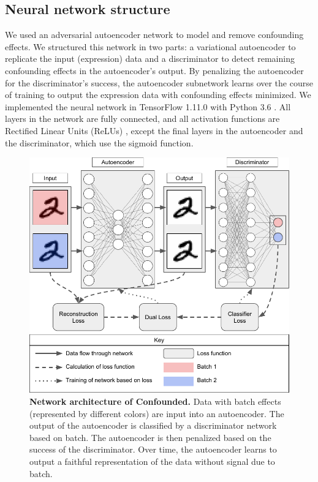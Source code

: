 \documentclass[11pt]{article}
\begin{document}
\subsection{Neural network structure}

We used an adversarial autoencoder network to model and remove confounding effects.
We structured this network in two parts: a variational autoencoder \cite{louizos_variational_2015} to replicate the input (expression) data and a discriminator to detect remaining confounding effects in the autoencoder's output.
By penalizing the autoencoder for the discriminator's success, the autoencoder subnetwork learns over the course of training to output the expression data with confounding effects minimized.
We implemented the neural network in TensorFlow 1.11.0 \cite{abadi_tensorflow_2015} with Python 3.6 \cite{python_software_foundation_python_2019}.
All layers in the network are fully connected, and all activation functions are Rectified Linear Units (ReLUs) \cite{agarap_deep_2018}, except the final layers in the autoencoder and the discriminator, which use the sigmoid function.

\begin{figure}
	\centering
	\includegraphics[width=\columnwidth]{figures/final/network.pdf}
	\caption[Network architecture of Confounded]{\textbf{Network architecture of Confounded.}
	Data with batch effects (represented by different colors) are input into an autoencoder.
	The output of the autoencoder is classified by a discriminator network based on batch.
	The autoencoder is then penalized based on the success of the discriminator.
	Over time, the autoencoder learns to output a faithful representation of the data without signal due to batch.}
	\label{fig:network}
\end{figure}
\end{document}
